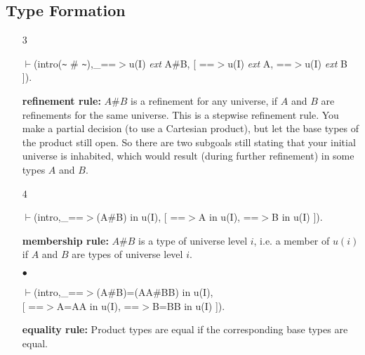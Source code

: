 \documentclass[11pt]{report}
\begin{document}
 \subsection{Type Formation}
 \begin{enumerate}
 \item[3]
\begin{sf}\begin{tabbing}
$\vdash$(intro({\verb`~`} \# {\verb`~`}),\_\hspace{0.1em}==$>$u(I) \mbox{\it ext} A\#B, [ ==$>$u(I) \mbox{\it ext} A, ==$>$u(I) \mbox{\it ext} B ]).
\end{tabbing}\end{sf}

 {\bf refinement rule:} $A\#B$ is a refinement
 for any universe, if $A$ and $B$ are refinements for the
 same universe.  This is a stepwise
 refinement rule. You make a partial decision (to use a Cartesian 
 product), but let the base types of the product still open. 
 So there are two subgoals still stating that your initial universe 
 is inhabited, which would result (during further refinement) in some
 types $A$ and $B$.
  
 \item[4]
\begin{sf}\begin{tabbing}
$\vdash$(intro,\_\hspace{0.1em}==$>$(A\#B) in u(I), [ ==$>$A in u(I), ==$>$B in u(I) ]).
\end{tabbing}\end{sf}

 {\bf membership rule:} $A\#B$ is a type of universe level $i$,
 i.e. a member of $u(i)$ if $A$ and $B$ are types of universe level $i$.
  
 \item[$\bullet$]
\begin{sf}\begin{tabbing}
$\vdash$(intro,\_\hspace{0.1em}==$>$(A\#B)=(AA\#BB) in u(I),\\[-0.15ex]
\hspace{2em}[ ==$>$A=AA in u(I), ==$>$B=BB in u(I) ]).
\end{tabbing}\end{sf}

 {\bf equality rule:}
 Product types are equal if the corresponding base types are equal.
 \end{enumerate}
  
\end{document}
